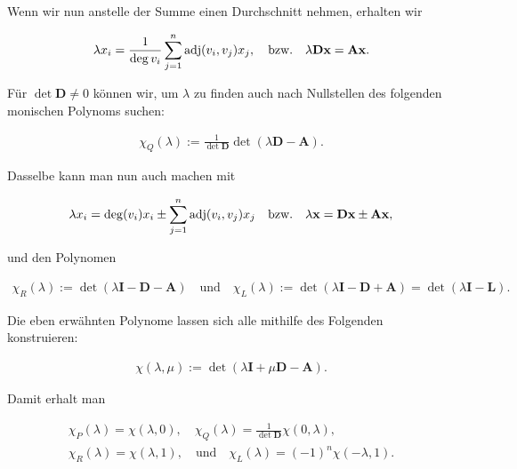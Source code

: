 \begin{remark}
            Wenn wir nun anstelle der Summe einen Durchschnitt nehmen, erhalten wir

            \begin{align*}
                \lambda x_i
                =
                \frac{1}{\deg v_i}
                \sum_{j=1}^n \operatorname{adj}(v_i, v_j) x_j,
                \quad
                \text{bzw.}
                \quad
                \lambda \mathbf D \mathbf x = \mathbf A \mathbf x.
            \end{align*}

            Für $\det \mathbf D \neq 0$ können wir, um $\lambda$ zu finden auch nach Nullstellen des folgenden monischen Polynoms suchen:

            \begin{align*}
                \chi_Q(\lambda) := \frac{1}{\det \mathbf D} \det(\lambda \mathbf D - \mathbf A).
            \end{align*}

            Dasselbe kann man nun auch machen mit

            \begin{align*}
                \lambda x_i = \deg(v_i) x_i \pm \sum_{j=1}^n \operatorname{adj}(v_i, v_j) x_j
                \quad
                \text{bzw.}
                \quad
                \lambda \mathbf x = \mathbf D \mathbf x \pm \mathbf A \mathbf x,
            \end{align*}

            und den Polynomen

            \begin{align*}
                \chi_R(\lambda) := \det(\lambda \mathbf I - \mathbf D - \mathbf A)
                \quad
                \text{und}
                \quad
                \chi_L(\lambda) := \det(\lambda \mathbf I - \mathbf D + \mathbf A) = \det(\lambda \mathbf I - \mathbf L).
            \end{align*}

            Die eben erwähnten Polynome lassen sich alle mithilfe des Folgenden konstruieren:

            \begin{align*}
                \chi(\lambda, \mu)
                :=
                \det(\lambda \mathbf I + \mu \mathbf D - \mathbf A).
            \end{align*}

            Damit erhalt man

            \begin{gather*}
                \chi_P(\lambda) = \chi(\lambda, 0),
                \quad
                \chi_Q(\lambda) = \frac{1}{\det \mathbf D} \chi(0, \lambda), \\
                \chi_R(\lambda) = \chi(\lambda, 1),
                \quad
                \text{und}
                \quad
                \chi_L(\lambda) = (-1)^n \chi(-\lambda, 1).
            \end{gather*}


\end{remark}
